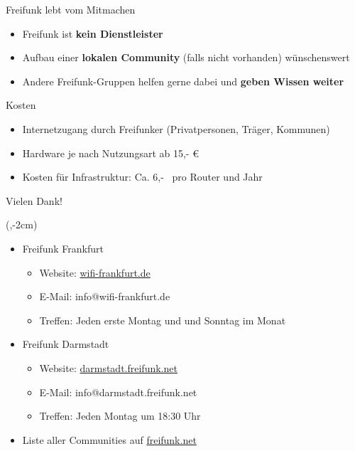 \documentclass[t]{beamer}
\begin{document}
  \begin{frame}{Freifunk lebt vom Mitmachen}
    \begin{itemize}
      \item Freifunk ist \textbf{kein Dienstleister}
      \item Aufbau einer \textbf{lokalen Community} (falls nicht vorhanden) wünschenswert
      \item Andere Freifunk-Gruppen helfen gerne dabei und \textbf{geben Wissen weiter}
    \end{itemize}
  \end{frame}

  \begin{frame}{Kosten}
    \begin{itemize}
      \item Internetzugang durch Freifunker (Privatpersonen, Träger, Kommunen)
      \item Hardware je nach Nutzungsart ab 15,- €
      \item Kosten für Infrastruktur: Ca. 6,- \texteuro\ pro Router und Jahr
    \end{itemize}
  \end{frame}


  \begin{frame}{Vielen Dank!}
    \begin{textblock*}{0cm}(\textwidth-2cm,-2cm)
      \begin{figure}[h]
        \def\svgwidth{2.5cm}
        
      \end{figure}
    \end{textblock*}
    \begin{itemize}
      \item Freifunk Frankfurt
      \begin{itemize}
        \item Website: \href{http://wifi-frankfurt.de}{wifi-frankfurt.de}
        \item E-Mail: info@wifi-frankfurt.de
        \item Treffen: Jeden erste Montag und und Sonntag im Monat
      \end{itemize}
      \item Freifunk Darmstadt
      \begin{itemize}
        \item Website: \href{http://darmstadt.freifunk.net/}{darmstadt.freifunk.net}
        \item E-Mail: info@darmstadt.freifunk.net
        \item Treffen: Jeden Montag um 18:30 Uhr
      \end{itemize}
      \vspace{1em}
      \item Liste aller Communities auf \href{https://freifunk.net/}{freifunk.net}
    \end{itemize}
  \end{frame}
\end{document}
